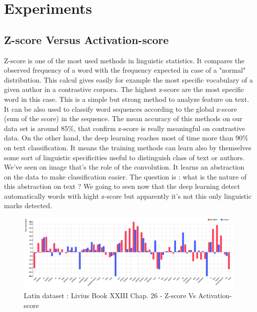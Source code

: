 \section{Experiments}

\subsection{Z-score Versus Activation-score}

Z-score is one of the most used methods in linguistic statistics. It compares the observed frequency of a word with the frequency expected in case of a "normal" distribution. This calcul gives easily for example the most specific vocabulary of a given author in a contrastive corpora. The highest z-score are the most specific word in this case. This is a simple but strong method to analyze feature on text. It can be also used to classify word sequences according to the global z-score (sum of the score) in the sequence. The mean accuracy of this methods on our data set is around 85\%, that confirm z-score is really meaningful on contrastive data. On the other hand, the deep learning reaches most of time more than 90\% on text classification. It means the training methods can learn also by themselves some sort of linguistic specificities useful to distinguish class of text or authors. We've seen on image that's the role of the convolution. It learns an abstraction on the data to make classification easier. The question is : what is the nature of this abstraction on text ? We going to seen now that the deep learning detect automatically words with hight z-score but apparently it's not this only linguistic marks detected.

\begin{figure}[h]
\begin{center}
\includegraphics[width=16cm]{img/z-score_activations.png}
\caption{Latin dataset : Livius Book XXIII Chap. 26 - Z-score Vs Activation-score}
\label{comparision}
\end{center}
\end{figure}

